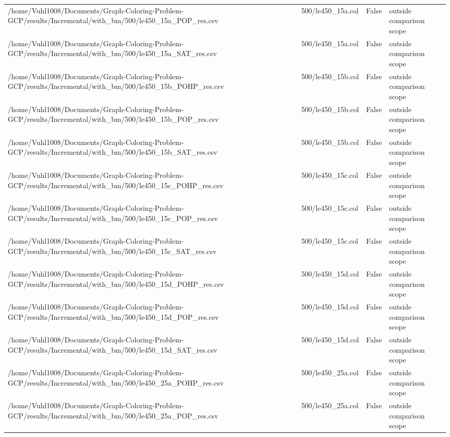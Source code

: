 \begin{table}[htbp]
\begin{tabular}{llll}
/home/Vuhl1008/Documents/Graph-Coloring-Problem-GCP/results/Incremental/with\_bm/500/le450\_15a\_POP\_res.csv & 500/le450\_15a.col & False & outside comparison scope \\
/home/Vuhl1008/Documents/Graph-Coloring-Problem-GCP/results/Incremental/with\_bm/500/le450\_15a\_SAT\_res.csv & 500/le450\_15a.col & False & outside comparison scope \\
/home/Vuhl1008/Documents/Graph-Coloring-Problem-GCP/results/Incremental/with\_bm/500/le450\_15b\_POHP\_res.csv & 500/le450\_15b.col & False & outside comparison scope \\
/home/Vuhl1008/Documents/Graph-Coloring-Problem-GCP/results/Incremental/with\_bm/500/le450\_15b\_POP\_res.csv & 500/le450\_15b.col & False & outside comparison scope \\
/home/Vuhl1008/Documents/Graph-Coloring-Problem-GCP/results/Incremental/with\_bm/500/le450\_15b\_SAT\_res.csv & 500/le450\_15b.col & False & outside comparison scope \\
/home/Vuhl1008/Documents/Graph-Coloring-Problem-GCP/results/Incremental/with\_bm/500/le450\_15c\_POHP\_res.csv & 500/le450\_15c.col & False & outside comparison scope \\
/home/Vuhl1008/Documents/Graph-Coloring-Problem-GCP/results/Incremental/with\_bm/500/le450\_15c\_POP\_res.csv & 500/le450\_15c.col & False & outside comparison scope \\
/home/Vuhl1008/Documents/Graph-Coloring-Problem-GCP/results/Incremental/with\_bm/500/le450\_15c\_SAT\_res.csv & 500/le450\_15c.col & False & outside comparison scope \\
/home/Vuhl1008/Documents/Graph-Coloring-Problem-GCP/results/Incremental/with\_bm/500/le450\_15d\_POHP\_res.csv & 500/le450\_15d.col & False & outside comparison scope \\
/home/Vuhl1008/Documents/Graph-Coloring-Problem-GCP/results/Incremental/with\_bm/500/le450\_15d\_POP\_res.csv & 500/le450\_15d.col & False & outside comparison scope \\
/home/Vuhl1008/Documents/Graph-Coloring-Problem-GCP/results/Incremental/with\_bm/500/le450\_15d\_SAT\_res.csv & 500/le450\_15d.col & False & outside comparison scope \\
/home/Vuhl1008/Documents/Graph-Coloring-Problem-GCP/results/Incremental/with\_bm/500/le450\_25a\_POHP\_res.csv & 500/le450\_25a.col & False & outside comparison scope \\
/home/Vuhl1008/Documents/Graph-Coloring-Problem-GCP/results/Incremental/with\_bm/500/le450\_25a\_POP\_res.csv & 500/le450\_25a.col & False & outside comparison scope \\

\end{tabular}
\end{table}
